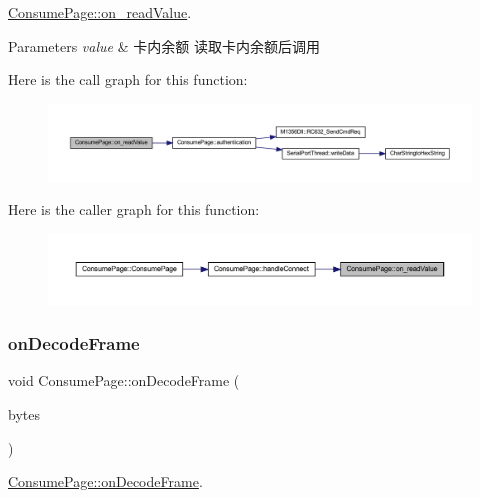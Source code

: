 \mbox{\hyperlink{class_consume_page_aee88a9a496e88620383622b4ab20e4c9}{Consume\+Page\+::on\+\_\+read\+Value}}. 


\begin{DoxyParams}{Parameters}
{\em value} & 卡内余额 读取卡内余额后调用 \\
\hline
\end{DoxyParams}
Here is the call graph for this function\+:
\nopagebreak
\begin{figure}[H]
\begin{center}
\leavevmode
\includegraphics[width=350pt]{class_consume_page_aee88a9a496e88620383622b4ab20e4c9_cgraph}
\end{center}
\end{figure}
Here is the caller graph for this function\+:
\nopagebreak
\begin{figure}[H]
\begin{center}
\leavevmode
\includegraphics[width=350pt]{class_consume_page_aee88a9a496e88620383622b4ab20e4c9_icgraph}
\end{center}
\end{figure}
\mbox{\label{class_consume_page_aad2165e62407257cd5a061a75e3e8cd2}} 
\subsubsection{\texorpdfstring{onDecodeFrame}{onDecodeFrame}}
{\footnotesize\ttfamily void Consume\+Page\+::on\+Decode\+Frame (\begin{DoxyParamCaption}\item[{Q\+Byte\+Array}]{bytes }\end{DoxyParamCaption})\hspace{0.3cm}{\ttfamily [slot]}}



\mbox{\hyperlink{class_consume_page_aad2165e62407257cd5a061a75e3e8cd2}{Consume\+Page\+::on\+Decode\+Frame}}. 


